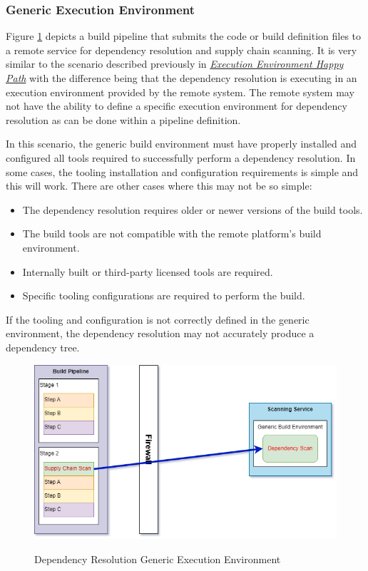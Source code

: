 \subsubsection{Generic Execution Environment}\label{sssec:generic_environment}

Figure \ref{fig:dependency_resolution_generic_env} depicts a build pipeline that
submits the code or build definition files to a remote service for dependency
resolution and supply chain scanning.  It is very similar to the scenario
described previously in \hyperref[sssec:happy_path]{\textit{Execution Environment Happy Path}}
with the difference being that the dependency resolution is executing in
an execution environment provided by the remote system.  The remote system may not have the
ability to define a specific execution environment for dependency resolution as can
be done within a pipeline definition.

In this scenario, the generic build environment must have properly installed and configured
all tools required to successfully perform a dependency resolution.  In some cases, 
the tooling installation and configuration requirements is simple and this will work.  There
are other cases where this may not be so simple:

\begin{itemize}
    \item The dependency resolution requires older or newer versions of the build tools.
    \item The build tools are not compatible with the remote platform's build environment.
    \item Internally built or third-party licensed tools are required.
    \item Specific tooling configurations are required to perform the build.
\end{itemize}

If the tooling and configuration is not correctly defined in the generic environment,
the dependency resolution may not accurately produce a dependency tree.

\begin{figure}[h]
    \caption{Dependency Resolution Generic Execution Environment}
    \includegraphics[width=\textwidth]{graphics/dependency_resolution_generic_env.png}
    \label{fig:dependency_resolution_generic_env}
\end{figure}



